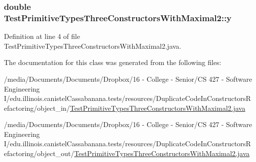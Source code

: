 \hypertarget{classTestPrimitiveTypesThreeConstructorsWithMaximal2_a765424ea939b63074c63d56aa0371d00}{
\subsubsection[{y}]{\setlength{\rightskip}{0pt plus 5cm}double {\bf TestPrimitiveTypesThreeConstructorsWithMaximal2::y}}}
\label{classTestPrimitiveTypesThreeConstructorsWithMaximal2_a765424ea939b63074c63d56aa0371d00}


Definition at line 4 of file TestPrimitiveTypesThreeConstructorsWithMaximal2.java.



The documentation for this class was generated from the following files:\begin{DoxyCompactItemize}
\item 
/media/Documents/Documents/Dropbox/16 -\/ College -\/ Senior/CS 427 -\/ Software Engineering I/edu.illinois.canistelCassabanana.tests/resources/DuplicateCodeInConstructorsRefactoring/object\_\-in/\hyperlink{object__in_2TestPrimitiveTypesThreeConstructorsWithMaximal2_8java}{TestPrimitiveTypesThreeConstructorsWithMaximal2.java}\item 
/media/Documents/Documents/Dropbox/16 -\/ College -\/ Senior/CS 427 -\/ Software Engineering I/edu.illinois.canistelCassabanana.tests/resources/DuplicateCodeInConstructorsRefactoring/object\_\-out/\hyperlink{object__out_2TestPrimitiveTypesThreeConstructorsWithMaximal2_8java}{TestPrimitiveTypesThreeConstructorsWithMaximal2.java}\end{DoxyCompactItemize}
